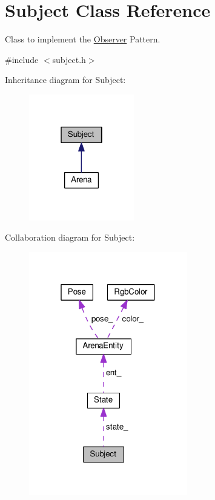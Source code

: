 \hypertarget{classSubject}{}\section{Subject Class Reference}
\label{classSubject}


Class to implement the \hyperlink{classObserver}{Observer} Pattern.  




{\ttfamily \#include $<$subject.\+h$>$}



Inheritance diagram for Subject\+:\nopagebreak
\begin{figure}[H]
\begin{center}
\leavevmode
\includegraphics[width=130pt]{classSubject__inherit__graph}
\end{center}
\end{figure}


Collaboration diagram for Subject\+:\nopagebreak
\begin{figure}[H]
\begin{center}
\leavevmode
\includegraphics[width=196pt]{classSubject__coll__graph}
\end{center}
\end{figure}
